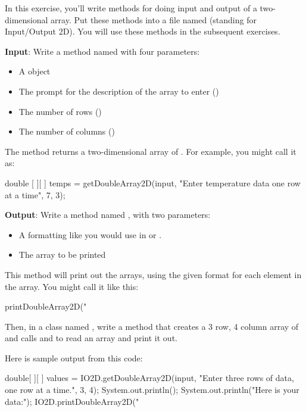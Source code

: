 \begin{exercise}
In this exercise, you'll write methods for doing input and output of a two-dimensional array. Put these methods into a file named  (standing for Input/Output 2D). You will use these methods in the subsequent exercises.

{\bf Input}: Write a  method named  with four parameters:

\begin{itemize}
\item A  object
\item The prompt for the description of the array to enter ()
\item The number of rows ()
\item The number of columns ()
\end{itemize}

The method returns a two-dimensional array of . For example, you might call it as:

\begin{code}
double [ ][ ] temps = getDoubleArray2D(input,
  "Enter temperature data one row at a time", 7, 3);
\end{code}

{\bf Output}: Write a  method named , with two parameters:
\begin{itemize}
\item A formatting  like you would use in  or .
\item The array to be printed
\end{itemize}

This method will print out the arrays, using the given format for each element in the array. You might call it
like this:

\begin{code}
printDoubleArray2D("%
\end{code}

Then, in a class named , write a  method that creates a 3 row, 4 column array of  and calls  and  to read an array and print it out. 

Here is sample output from this code:

\begin{code}
double[ ][ ] values = IO2D.getDoubleArray2D(input,
    "Enter three rows of data, one row at a time.", 3, 4);
System.out.println();
System.out.println("Here is your data:");
IO2D.printDoubleArray2D("%
\end{code}


\end{exercise}
